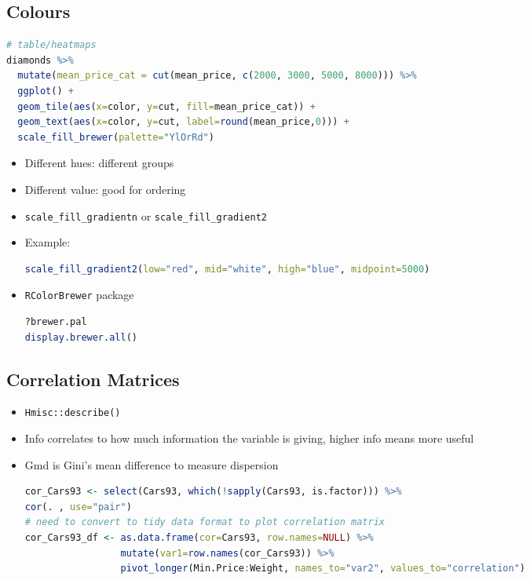 \documentclass{article}
\begin{document}
\begin{multicols}{2}
\subsection{Colours}
\begin{lstlisting}[language=R]
# table/heatmaps
diamonds %>%
  mutate(mean_price_cat = cut(mean_price, c(2000, 3000, 5000, 8000))) %>%
  ggplot() +
  geom_tile(aes(x=color, y=cut, fill=mean_price_cat)) +
  geom_text(aes(x=color, y=cut, label=round(mean_price,0))) +
  scale_fill_brewer(palette="YlOrRd")
\end{lstlisting}
\begin{itemize}
	\item Different hues: different groups
	\item Different value: good for ordering
	\item \texttt{scale\_fill\_gradientn} or \texttt{scale\_fill\_gradient2}
	\item Example:
	\begin{lstlisting}[language=R]
scale_fill_gradient2(low="red", mid="white", high="blue", midpoint=5000)
\end{lstlisting}
    \item \texttt{RColorBrewer} package
    \begin{lstlisting}[language=R]
?brewer.pal
display.brewer.all()
\end{lstlisting}
\end{itemize}

\subsection{Correlation Matrices}
\begin{itemize}
	\item \texttt{Hmisc::describe()}
	\item Info correlates to how much information the variable is giving, higher info means more useful
	\item Gmd is Gini's mean difference to measure dispersion
	\begin{lstlisting}[language=R]
cor_Cars93 <- select(Cars93, which(!sapply(Cars93, is.factor))) %>%
cor(. , use="pair")
# need to convert to tidy data format to plot correlation matrix
cor_Cars93_df <- as.data.frame(cor=Cars93, row.names=NULL) %>%
                 mutate(var1=row.names(cor_Cars93)) %>%
                 pivot_longer(Min.Price:Weight, names_to="var2", values_to="correlation")
\end{lstlisting}
\end{itemize}

\end{multicols}
\end{document}
